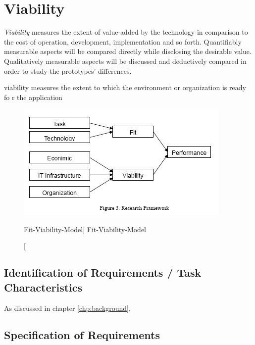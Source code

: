 \section{Viability}

\textit{Viability} measures the extent of value-added by the technology in comparison to the cost of operation, development, implementation and so forth. Quantifiably measurable aspects will be compared directly while disclosing the desirable value. Qualitatively measurable aspects will be discussed and deductively compared in order to study the prototypes' differences. 

viability  measures the extent to which the environment or organization is ready fo r the application



\begin{figure}[ht]
    \includegraphics[width=0.7\linewidth]{images/methodology/fvm.jpg}\centering
    \caption
    [Fit-Viability-Model]
    {Fit-Viability-Model \cite{Liang2007AdoptionModel}}
\end{figure}


\subsection{Identification of Requirements / Task Characteristics}

As discussed in chapter \ref{chp:background},

\subsection{Specification of Requirements}

